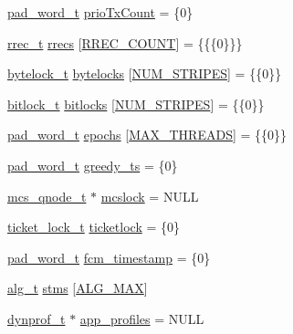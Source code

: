 \begin{DoxyCompactItemize}
\hyperlink{structstm_1_1pad__word__t}{pad\-\_\-word\-\_\-t} \hyperlink{namespacestm_a487249084a21cda5f208d7a25b3c385e}{prio\-Tx\-Count} = \{0\}
\item 
\hyperlink{structstm_1_1rrec__t}{rrec\-\_\-t} \hyperlink{namespacestm_a025af84316e5fb6b9033dec86640f912}{rrecs} \mbox{[}\hyperlink{namespacestm_ac811b3e7503fcf79d860e5a9f997f673}{R\-R\-E\-C\-\_\-\-C\-O\-U\-N\-T}\mbox{]} = \{\{\{0\}\}\}
\item 
\hyperlink{structstm_1_1bytelock__t}{bytelock\-\_\-t} \hyperlink{namespacestm_abea1740c6c56b45f46aa26a594caadb6}{bytelocks} \mbox{[}\hyperlink{namespacestm_ac333fa1ea03145d9c5d601624ab507eb}{N\-U\-M\-\_\-\-S\-T\-R\-I\-P\-E\-S}\mbox{]} = \{\{0\}\}
\item 
\hyperlink{structstm_1_1bitlock__t}{bitlock\-\_\-t} \hyperlink{namespacestm_a5984f2381f2e7e81b5e647d6e7f9ebe3}{bitlocks} \mbox{[}\hyperlink{namespacestm_ac333fa1ea03145d9c5d601624ab507eb}{N\-U\-M\-\_\-\-S\-T\-R\-I\-P\-E\-S}\mbox{]} = \{\{0\}\}
\item 
\hyperlink{structstm_1_1pad__word__t}{pad\-\_\-word\-\_\-t} \hyperlink{namespacestm_a162bd0b45643942e59ea68af00fec992}{epochs} \mbox{[}\hyperlink{namespacestm_a41da58ff755b92c2c2903c8e2844f6c4}{M\-A\-X\-\_\-\-T\-H\-R\-E\-A\-D\-S}\mbox{]} = \{\{0\}\}
\item 
\hyperlink{structstm_1_1pad__word__t}{pad\-\_\-word\-\_\-t} \hyperlink{namespacestm_a82e6b09074d58a249ff29b161be62ab6}{greedy\-\_\-ts} = \{0\}
\item 
\hyperlink{structmcs__qnode__t}{mcs\-\_\-qnode\-\_\-t} $\ast$ \hyperlink{namespacestm_a61e4fdd8145b69c03eab91bdeddb0293}{mcslock} = N\-U\-L\-L
\item 
\hyperlink{structticket__lock__t}{ticket\-\_\-lock\-\_\-t} \hyperlink{namespacestm_af262f754120f34d53b7aff4f3ee4e447}{ticketlock} = \{0\}
\item 
\hyperlink{structstm_1_1pad__word__t}{pad\-\_\-word\-\_\-t} \hyperlink{namespacestm_a05cd8e71fbf5f13425c1c6db187bb583}{fcm\-\_\-timestamp} = \{0\}
\item 
\hyperlink{structstm_1_1alg__t}{alg\-\_\-t} \hyperlink{namespacestm_af0a1336341054a7273c3d732d248f7fc}{stms} \mbox{[}\hyperlink{namespacestm_ad75547cc23d4014783868b799d740145a466ea15eb4c3d10520bd729f59123097}{A\-L\-G\-\_\-\-M\-A\-X}\mbox{]}
\item 
\hyperlink{structstm_1_1dynprof__t}{dynprof\-\_\-t} $\ast$ \hyperlink{namespacestm_a067ff48e3e80f9f2ee75df5b1156827b}{app\-\_\-profiles} = N\-U\-L\-L
\item 

\end{DoxyCompactItemize}
